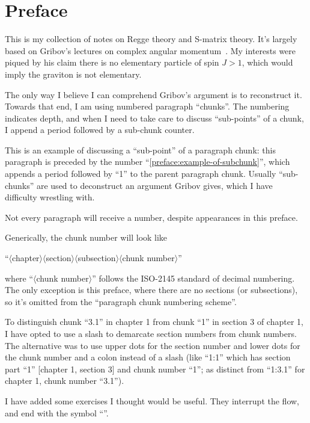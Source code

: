 \chapter*{Preface}

\M{}
This is my collection of notes on Regge theory and S-matrix theory.
It's largely based on Gribov's lectures on complex angular momentum~\cite{Gribov:2003nw}.
My interests were piqued by his claim there is no elementary particle of
spin $J>1$, which would imply the graviton is not elementary.

The only way I believe I can comprehend Gribov's argument is to
reconstruct it. Towards that end, I am using numbered paragraph
``chunks''. The numbering indicates depth, and when I need to take care
to discuss ``sub-points'' of a chunk, I append a period followed by a
sub-chunk counter.

\M[1]\label{preface:example-of-subchunk}
This is an example of discussing a ``sub-point'' of a paragraph
chunk: this paragraph is preceded by the number
``\ref{preface:example-of-subchunk}'', which appends a period followed
by ``1'' to the parent paragraph chunk.
Usually ``sub-chunks'' are used to deconstruct an argument Gribov gives, which
I have difficulty wrestling with.

\M
Not every paragraph will receive a number, despite appearances in this
preface.

\makeatletter
{} Generically, the chunk number will look like
\begin{center}
``$\langle$chapter$\rangle$\chunk@separator$\langle$section$\rangle$\chunk@separator$\langle$subsection$\rangle$\chunk@divider$\langle$chunk number$\rangle$''
\end{center}
where ``$\langle$chunk number$\rangle$'' follows the ISO-2145 standard
of decimal numbering. The only exception is this preface, where there
are no sections (or subsections), so it's omitted from the ``paragraph
chunk numbering scheme''.

To distinguish chunk ``3.1'' in chapter 1 from chunk ``1'' in section 3
of chapter 1, I have opted to use a slash to demarcate section numbers
from chunk numbers. The alternative was to use upper dots for the
section number and lower dots for the chunk number and a colon instead
of a slash (like ``1:1'' which has section part
``1'' [chapter 1, section 3] and chunk number ``1''; as
distinct from ``1:3.1'' for chapter 1, chunk number ``3.1'').
\makeatother

 I have added some exercises I thought would be
useful. They interrupt the flow, and end with the symbol ``\exercisesymbol''.